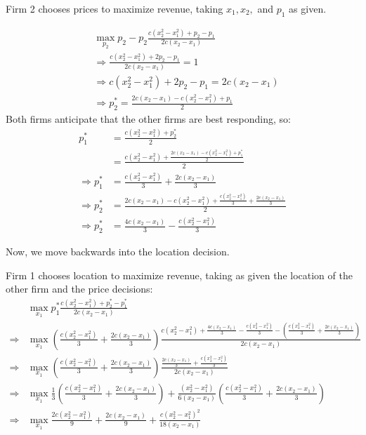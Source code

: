 \documentclass[11pt]{article} %
\begin{document}
Firm 2 chooses prices to maximize revenue, taking $x_1, x_2,$ and $p_1$ as given. 

\begin{align*}
&\max_{p_2}  p_2-p_2\frac{c(x_2^2 - x_1^2) + p_2 - p_1}{2c(x_2 - x_1)}\\
&\Rightarrow \frac{c(x_2^2 - x_1^2) + 2p_2 - p_1}{2c(x_2 - x_1)} = 1\\
&\Rightarrow c(x_2^2 - x_1^2) + 2p_2 - p_1 = 2c(x_2 - x_1)\\
&\Rightarrow p_2^{*} = \frac{ 2c(x_2 - x_1) - c(x_2^2 - x_1^2) + p_1 }{2}
\end{align*}
Both firms anticipate that the other firms are best responding, so:
\begin{align*}
 p_1^{*} &= \frac{c(x_2^2 - x_1^2) + p_2^{*}}{2}\\
&= \frac{c(x_2^2 - x_1^2) + \frac{ 2c(x_2 - x_1) - c(x_2^2 - x_1^2) + p_1^{*} }{2}}{2}\\
\Rightarrow p_1^{*} &= \frac{c(x_2^2 - x_1^2)}{3} + \frac{2c(x_2 - x_1)}{3}\\
\Rightarrow p_2^{*} &=  \frac{ 2c(x_2 - x_1) - c(x_2^2 - x_1^2) +  \frac{c(x_2^2 - x_1^2)}{3} + \frac{2c(x_2 - x_1)}{3} }{2}\\
\Rightarrow p_2^{*} &= \frac{4c(x_2 - x_1)}{3} - \frac{c(x_2^2 - x_1^2)}{3}
\end{align*}

Now, we move backwards into the location decision. 

Firm 1 chooses location to maximize revenue, taking as given the location of the other firm and the price decisions:
\begin{align*}
&\max_{x_1} p_1^{*}\frac{c(x_2^2 - x_1^2) + p_2^{*} - p_1^{*}}{2c(x_2 - x_1)}\\
\Rightarrow &\max_{x_1} \left( \frac{c(x_2^2 - x_1^2)}{3} + \frac{2c(x_2 - x_1)}{3}\right)\frac{c(x_2^2 - x_1^2) + \frac{4c(x_2 - x_1)}{3} - \frac{c(x_2^2 - x_1^2)}{3} - \left( \frac{c(x_2^2 - x_1^2)}{3} + \frac{2c(x_2 - x_1)}{3}\right)}{2c(x_2 - x_1)}\\
\Rightarrow &\max_{x_1} \left( \frac{c(x_2^2 - x_1^2)}{3} + \frac{2c(x_2 - x_1)}{3}\right)\frac{ \frac{2c(x_2 - x_1)}{3} + \frac{c(x_2^2 - x_1^2)}{3} }{2c(x_2 - x_1)}\\
\Rightarrow &\max_{x_1} \frac{1}{3}\left( \frac{c(x_2^2 - x_1^2)}{3} + \frac{2c(x_2 - x_1)}{3}\right) +\frac{(x_2^2 - x_1^2)}{6(x_2 - x_1)}\left( \frac{c(x_2^2 - x_1^2)}{3} + \frac{2c(x_2 - x_1)}{3}\right) \\
\Rightarrow &\max_{x_1} \frac{2c(x_2^2 - x_1^2)}{9} + \frac{2c(x_2 - x_1)}{9}+\frac{c(x_2^2 - x_1^2)^2}{18(x_2 - x_1)} %
\end{align*}
\end{document}
